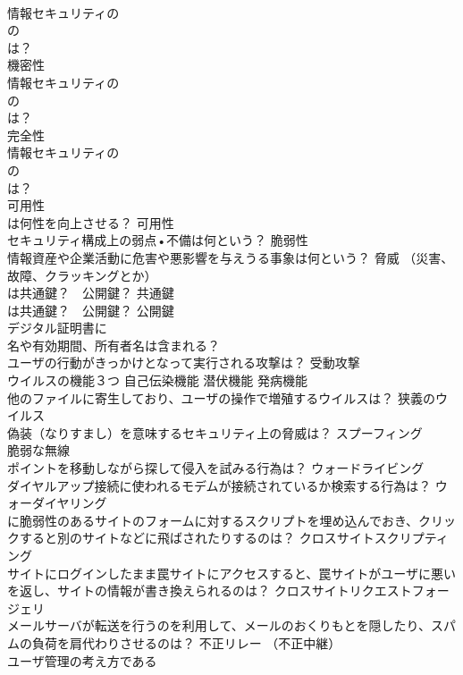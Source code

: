 \documentclass[8pt]{extreport}
\begin{document}
\begin{CJK}{UTF8}{min}
\\	情報セキュリティの
\\	の
\\	は？	
\\	機密性
\\	情報セキュリティの
\\	の
\\	は？	
\\	完全性
\\	情報セキュリティの
\\	の
\\	は？	
\\	可用性
\\	は何性を向上させる？	可用性
\\	セキュリティ構成上の弱点•不備は何という？	脆弱性
\\	情報資産や企業活動に危害や悪影響を与えうる事象は何という？	脅威 （災害、故障、クラッキングとか）
\\	は共通鍵？　公開鍵？	共通鍵
\\	は共通鍵？　公開鍵？	公開鍵
\\	デジタル証明書に
\\	名や有効期間、所有者名は含まれる？	
\\	ユーザの行動がきっかけとなって実行される攻撃は？	受動攻撃
\\	ウイルスの機能３つ	自己伝染機能 潜伏機能 発病機能
\\	他のファイルに寄生しており、ユーザの操作で増殖するウイルスは？	狭義のウイルス
\\	偽装（なりすまし）を意味するセキュリティ上の脅威は？	スプーフィング
\\	脆弱な無線
\\	ポイントを移動しながら探して侵入を試みる行為は？	ウォードライビング
\\	ダイヤルアップ接続に使われるモデムが接続されているか検索する行為は？	ウォーダイヤリング
\\	に脆弱性のあるサイトのフォームに対するスクリプトを埋め込んでおき、クリックすると別のサイトなどに飛ばされたりするのは？	クロスサイトスクリプティング
\\	サイトにログインしたまま罠サイトにアクセスすると、罠サイトがユーザに悪い
\\	を返し、サイトの情報が書き換えられるのは？	クロスサイトリクエストフォージェリ 
\\	メールサーバが転送を行うのを利用して、メールのおくりもとを隠したり、スパムの負荷を肩代わりさせるのは？	不正リレー （不正中継）
\\	ユーザ管理の考え方である

\end{CJK}
\end{document}

